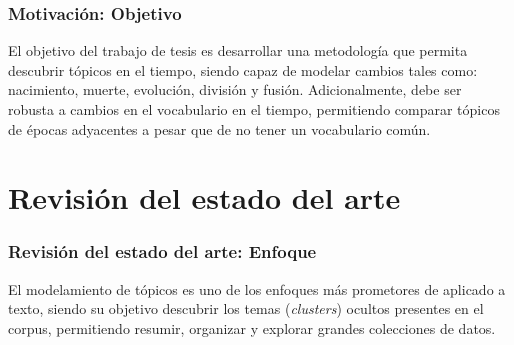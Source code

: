 \documentclass[
	spanish, %
	aspectratio=43, %
	hyperref={pdfencoding=auto,psdextra},
	xcolor={dvipsnames,table,usenames}
]{beamer}
\begin{document}
\begin{frame}
  
\frametitle{Motivación: Objetivo}
El objetivo del trabajo de tesis es desarrollar una metodología que permita descubrir tópicos en el tiempo, siendo capaz de modelar cambios tales como: nacimiento, muerte, evolución, división y fusión. Adicionalmente, debe ser robusta a cambios en el vocabulario en el tiempo, permitiendo comparar tópicos de épocas adyacentes a pesar que de no tener un vocabulario común.


\end{frame}


\section{Revisión del estado del arte}

\begin{frame}

\frametitle{Revisión del estado del arte: Enfoque}
El modelamiento de tópicos es uno de los enfoques más prometores de  aplicado a texto, siendo su objetivo descubrir los temas (\textit{clusters}) ocultos presentes en el corpus, permitiendo resumir, organizar y explorar grandes colecciones de datos.



\end{frame}
\end{document}
